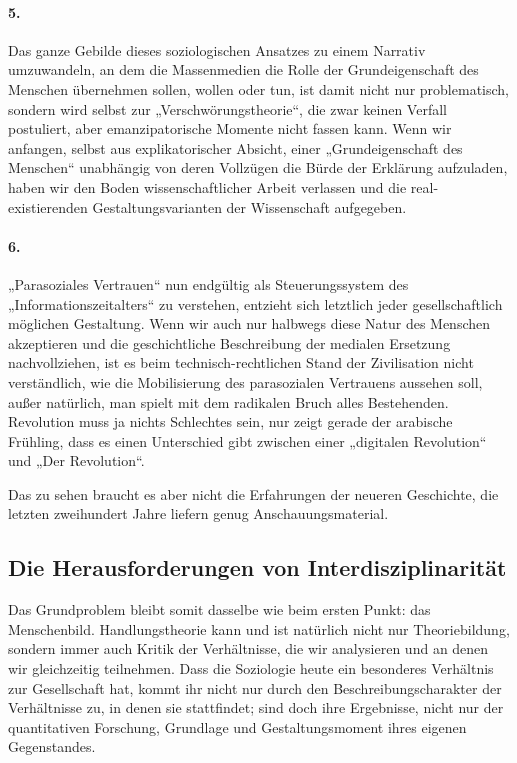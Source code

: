 \documentclass[12pt,a4paper]{article}
\begin{document}
\paragraph{5.} 
Das ganze Gebilde dieses soziologischen Ansatzes zu einem Narrativ umzuwandeln,
an dem die Massenmedien die Rolle der Grundeigenschaft des Menschen übernehmen
sollen, wollen oder tun, ist damit nicht nur problematisch, sondern wird selbst
zur „Verschwörungstheorie“, die zwar keinen Verfall postuliert, aber
emanzipatorische Momente nicht fassen kann. Wenn wir anfangen, selbst aus
explikatorischer Absicht, einer „Grundeigenschaft des Menschen“ unabhängig von
deren Vollzügen die Bürde der Erklärung aufzuladen, haben wir den Boden
wissenschaftlicher Arbeit verlassen und die real-existierenden
Gestaltungsvarianten der Wissenschaft aufgegeben.

\paragraph{6.} 
„Parasoziales Vertrauen“ nun endgültig als Steuerungssystem des
„Informationszeitalters“ zu verstehen, entzieht sich letztlich jeder
gesellschaftlich möglichen Gestaltung. Wenn wir auch nur halbwegs diese Natur
des Menschen akzeptieren und die geschichtliche Beschreibung der medialen
Ersetzung nachvollziehen, ist es beim technisch-rechtlichen Stand der
Zivilisation nicht verständlich, wie die Mobilisierung des parasozialen
Vertrauens aussehen soll, außer natürlich, man spielt mit dem radikalen Bruch
alles Bestehenden. Revolution muss ja nichts Schlechtes sein, nur zeigt gerade
der arabische Frühling, dass es einen Unterschied gibt zwischen einer
„digitalen Revolution“ und „Der Revolution“.  

Das zu sehen braucht es aber nicht die Erfahrungen der neueren Geschichte, die
letzten zweihundert Jahre liefern genug Anschauungsmaterial.

\subsection*{Die Herausforderungen von Interdisziplinarität}

Das Grundproblem bleibt somit dasselbe wie beim ersten Punkt: das Menschenbild.
Handlungstheorie kann und ist natürlich nicht nur Theoriebildung, sondern immer
auch Kritik der Verhältnisse, die wir analysieren und an denen wir gleichzeitig
teilnehmen. Dass die Soziologie heute ein besonderes Verhältnis zur
Gesellschaft hat, kommt ihr nicht nur durch den Beschreibungscharakter der
Verhältnisse zu, in denen sie stattfindet; sind doch ihre Ergebnisse, nicht nur
der quantitativen Forschung, Grundlage und Gestaltungsmoment ihres eigenen
Gegenstandes.
\end{document}
